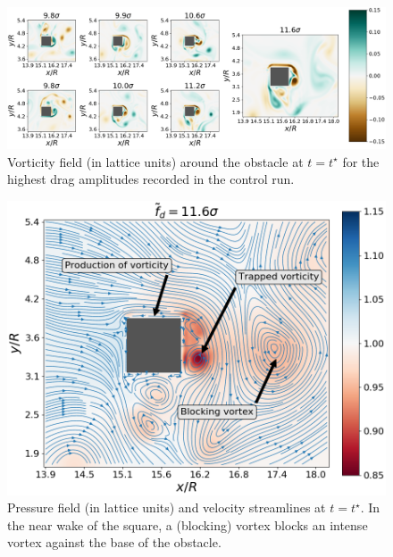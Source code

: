 \documentclass{jfm}
\begin{document}
\begin{figure}
	\centering
	\includegraphics[width=\linewidth]{illustr_extrms_vorticity/illustr_extrms_vorticity.png}
	\caption{\label{fig:top_4_events_vorticity} Vorticity field (in lattice units) around the obstacle at $t=t^{\star}$ for the highest drag amplitudes recorded in the control run.
	}
\end{figure}

\begin{figure}
	\centering
	\includegraphics[width=.5\linewidth]{illustr_density_streamlines/illustr_density_streamlines.png}
	\caption{\label{fig:density+streamlines} Pressure field (in lattice units) and velocity streamlines at $t=t^{\star}$. In the near wake of the square, a (blocking) vortex blocks an intense vortex against the base of the obstacle.}
\end{figure}
\end{document}
